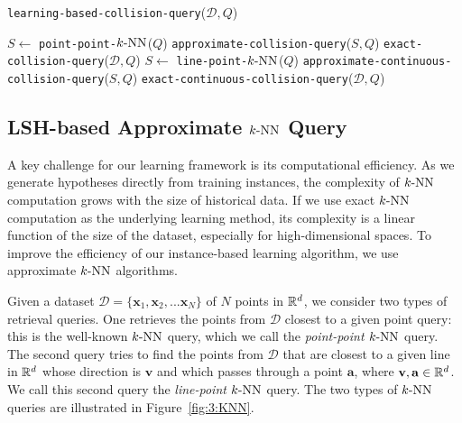 \begin{algorithm}[htb]
    \caption{\texttt{learning-based-collision-query}($\mathcal D, Q$)}
    \label{algo:3:collisionquery}
    \begin{algorithmic}[1]
	   	   \STATE $S \leftarrow $ \texttt{point-point-$k\text{-NN}$}($Q$)
				\STATE \texttt{approximate-collision-query}($S, Q$)
		   \ELSE
				\STATE \texttt{exact-collision-query}($\mathcal D, Q$)
           \ENDIF
   \ENDIF
              \STATE  $S \leftarrow $ \texttt{line-point-$k\text{-NN}$}($Q$)
				   \STATE \texttt{approximate-continuous-collision-query}($S, Q$)
			  \ELSE
                    \STATE \texttt{exact-continuous-collision-query}($\mathcal D, Q$)
              \ENDIF
\ENDIF
	    \end{algorithmic}
\end{algorithm}




\subsection{LSH-based Approximate $k\text{-NN}$ Query}
\label{sec:3:overview:lsh}
A key challenge for our learning framework is its computational efficiency. As we generate hypotheses directly from training instances, the complexity of $k\text{-NN}$ computation grows with the size of historical data. If we use exact $k\text{-NN}$ computation as the underlying learning method, its complexity is a linear function of the size of the dataset, especially for high-dimensional spaces. To improve the efficiency of our instance-based learning algorithm, we use approximate $k\text{-NN}$ algorithms.

Given a dataset $\mathcal D = \{\mathbf x_1, \mathbf x_2, ... \mathbf x_N\}$ of $N$ points in $\mathbb R^d$, we consider two types of retrieval queries. One retrieves the points from $\mathcal D$ closest to a given point query: this is the well-known $k\text{-NN}$ query, which we call the \emph{point-point $k\text{-NN}$} query. The second query tries to find the points from $\mathcal D$ that are closest to a given line in $\mathbb R^d$ whose direction is $\mathbf v$ and which passes through a point $\mathbf a$, where $\mathbf v, \mathbf a \in \mathbb R^d$. We call this second query the \emph{line-point $k\text{-NN}$} query. The two types of $k\text{-NN}$ queries are illustrated in Figure~\ref{fig:3:KNN}.


